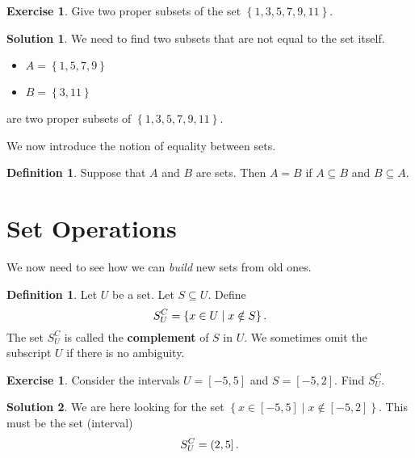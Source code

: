 \documentclass[a4paper, 11pt]{report}
\theoremstyle{plain}
\theoremstyle{definition}
\newtheorem{defn}[thm]{Definition}
\newtheorem{exrc}[thm]{Exercise}
\newtheorem*{sltn}{Solution}
\begin{document}
\begin{exrc}
  Give two proper subsets of the set $\left\{ 1, 3, 5, 7, 9, 11 \right\}$.
\end{exrc}
\begin{sltn}
  We need to find two subsets that are not equal to the set itself.
  \begin{itemize}
    \item $A = \left\{ 1, 5, 7, 9 \right\}$
    \item $B = \left\{ 3, 11 \right\}$
  \end{itemize}
  are two proper subsets of $\left\{ 1, 3, 5, 7, 9, 11 \right\}$.
\end{sltn}

We now introduce the notion of equality between sets.
\begin{defn}
  Suppose that $A$ and $B$ are sets. Then $A = B$ if $A \subseteq B$ and $B \subseteq A$.
\end{defn}

\section{Set Operations}
\label{sec:set_operations}

We now need to see how we can \textit{build} new sets from old ones.

\begin{defn}
  Let $U$ be a set. Let $S \subseteq U$. Define
  \begin{equation}
    \notag
    S_U^C = \left\{ x \in U \mid x \notin S \right\}.
  \end{equation}
  The set $S_U^C$ is called the \textbf{complement} of $S$ in
  $U$. We sometimes omit the subscript $U$ if there is no ambiguity.
\end{defn}

\begin{exrc}
Consider the intervals $U = \left[ -5, 5 \right]$ and $S = \left[ -5, 2 \right]$. Find $S_U^C$.
\end{exrc}
\begin{sltn}
  We are here looking for the set $\left\{ x \in \left[ -5, 5 \right] \mid x
  \notin \left[ -5, 2 \right] \right\}$.  This must be the set (interval)
  \begin{equation}
    \notag
    S_U^C = \left( 2, 5 \right].
  \end{equation}
\end{sltn}
\end{document}

